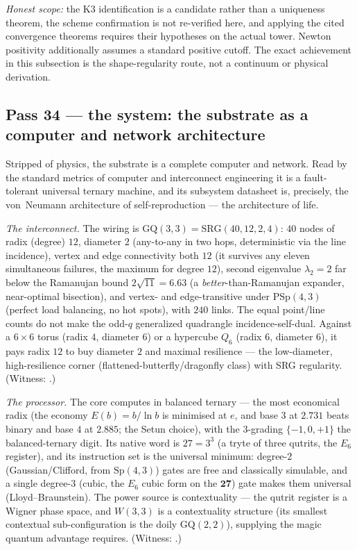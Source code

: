 \documentclass[11pt]{article}
\begin{document}
\emph{Honest scope:} the K3 identification is a candidate rather than a uniqueness theorem, the
scheme confirmation is not re-verified here, and applying the cited convergence theorems requires
their hypotheses on the actual tower. Newton positivity additionally assumes a standard positive
cutoff. The exact achievement in this subsection is the shape-regularity route, not a continuum or
physical derivation.

\subsection{Pass 34 --- the system: the substrate as a computer and network architecture}
\label{sec:capstone-thirtyfour}

Stripped of physics, the substrate is a complete computer and network. Read by the standard metrics
of computer and interconnect engineering it is a fault-tolerant universal ternary machine, and its
subsystem datasheet is, precisely, the von~Neumann architecture of self-reproduction --- the
architecture of life.

\emph{The interconnect.} The wiring is $\mathrm{GQ}(3,3)=\mathrm{SRG}(40,12,2,4)$: $40$ nodes of
radix (degree) $12$, diameter $2$ (any-to-any in two hops, deterministic via the line incidence),
vertex and edge connectivity both $12$ (it survives any eleven simultaneous failures, the maximum
for degree $12$), second eigenvalue $\lambda_2=2$ far below the Ramanujan bound $2\sqrt{11}=6.63$
(a \emph{better}-than-Ramanujan expander, near-optimal bisection), and vertex- and edge-transitive
under $\mathrm{PSp}(4,3)$ (perfect load balancing, no hot spots), with $240$ links.  The equal
point/line counts do not make the odd-$q$ generalized quadrangle incidence-self-dual. Against a
$6{\times}6$ torus (radix $4$, diameter $6$) or a hypercube
$Q_6$ (radix $6$, diameter $6$), it pays radix $12$ to buy diameter $2$ and maximal resilience ---
the low-diameter, high-resilience corner (flattened-butterfly/dragonfly class) with SRG regularity.
(Witness: .)

\emph{The processor.} The core computes in balanced ternary --- the most economical radix (the
economy $E(b)=b/\ln b$ is minimised at $e$, and base $3$ at $2.731$ beats binary and base $4$ at
$2.885$; the Setun choice), with the $3$-grading $\{-1,0,+1\}$ the balanced-ternary digit. Its
native word is $27=3^3$ (a tryte of three qutrits, the $E_6$ register), and its instruction set is
the universal minimum: degree-$2$ (Gaussian/Clifford, from $\mathrm{Sp}(4,3)$) gates are free and
classically simulable, and a single degree-$3$ (cubic, the $E_6$ cubic form on the $\mathbf{27}$)
gate makes them universal (Lloyd--Braunstein). The power source is contextuality --- the qutrit
register is a Wigner phase space, and $W(3,3)$ is a contextuality structure (its smallest contextual
sub-configuration is the doily $\mathrm{GQ}(2,2)$), supplying the magic quantum advantage requires.
(Witness: .)
\end{document}
